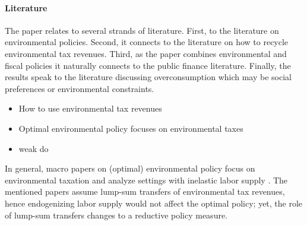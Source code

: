 \paragraph{Literature}

The paper relates to several strands of literature. 
First, to the literature on environmental policies. Second, it connects to the literature on how to recycle environmental tax revenues. Third, as the paper combines environmental and fiscal policies it naturally connects to the public finance literature. Finally, the results speak to the literature discussing overconsumption  which may be social preferences or environmental constraints. 

 
\begin{itemize}
	\item How to use environmental tax revenues \citep{Fried2018TheGenerations}
	\item Optimal environmental policy \ar focuses on environmental taxes
	\item weak do
\end{itemize}


In general, macro papers on (optimal) environmental policy focus on environmental taxation and analyze settings with inelastic labor supply \citep{Golosov2014OptimalEquilibrium, Acemoglu2012TheChang, Fried2018ClimateAnalysis, Acemoglu2016TransitionTechnology}. The mentioned papers assume lump-sum transfers of environmental tax revenues, hence endogenizing labor supply would not affect the optimal policy; yet, the role of lump-sum transfers changes to a reductive policy measure.
% 

%

